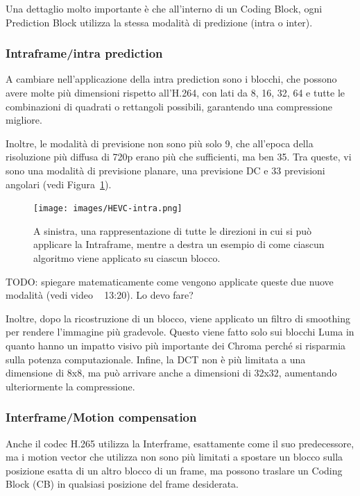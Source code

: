 \documentclass[a4paper,12pt, oneside]{article}
\begin{document}
Una dettaglio molto importante è che all'interno di un Coding Block, ogni Prediction Block utilizza la
stessa modalità di predizione (intra o inter).

\subsubsection{Intraframe/intra prediction}
A cambiare nell'applicazione della intra prediction sono i blocchi, che possono avere molte più
dimensioni rispetto all'H.264, con lati da 8, 16, 32, 64 e tutte le combinazioni di quadrati o rettangoli
possibili, garantendo una compressione migliore.

Inoltre, le modalità di previsione non sono più solo 9, che all'epoca della risoluzione più diffusa di 720p
erano più che sufficienti, ma ben 35. Tra queste, vi sono una modalità di previsione planare, una previsione DC 
e 33 previsioni angolari (vedi Figura~\ref{fig:HEVC_intra}).

\begin{figure}[h]
    \centering
    \texttt{[image: images/HEVC-intra.png]}
    \caption{A sinistra, una rappresentazione di tutte le direzioni in cui si può applicare la Intraframe,
    mentre a destra un esempio di come ciascun algoritmo viene applicato su ciascun blocco.}
    \label{fig:HEVC_intra}
\end{figure}

TODO: spiegare matematicamente come vengono applicate queste due nuove modalità (vedi video ~ 13:20). Lo devo fare?

Inoltre, dopo la ricostruzione di un blocco, viene applicato un filtro di smoothing per rendere
l'immagine più gradevole. Questo viene fatto solo sui blocchi Luma in quanto hanno un impatto visivo più
importante dei Chroma perché si risparmia sulla potenza computazionale.
Infine, la DCT non è più limitata a una dimensione di 8x8, ma può arrivare anche a dimensioni di 32x32,
aumentando ulteriormente la compressione.

\subsubsection{Interframe/Motion compensation}
Anche il codec H.265 utilizza la Interframe, esattamente come il suo predecessore, ma i motion vector che
utilizza non sono più limitati a spostare un blocco sulla posizione esatta di un altro blocco di un frame,
ma possono traslare un Coding Block (CB) in qualsiasi posizione del frame desiderata.
\end{document}
